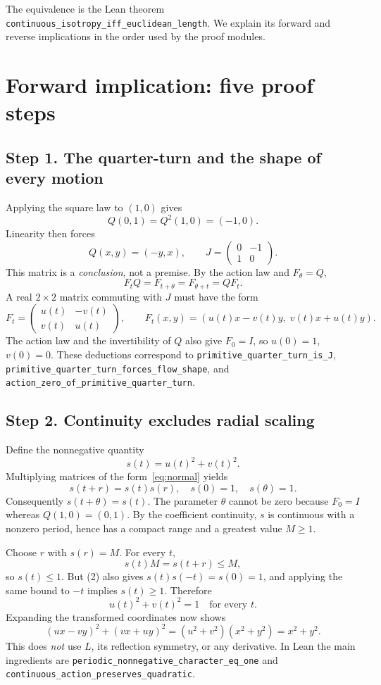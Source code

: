 \documentclass[11pt,a4paper]{article}
\begin{document}
The equivalence is the Lean theorem
\texttt{continuous\_isotropy\_iff\_euclidean\_length}.
We explain its forward and reverse implications in the order
used by the proof modules.

\section{Forward implication: five proof steps}

\subsection*{Step 1. The quarter-turn and the shape of every motion}

Applying the square law to $(1,0)$ gives
\[
 Q(0,1)=Q^2(1,0)=(-1,0).
\]
Linearity then forces
\[
 Q(x,y)=(-y,x),\qquad
 J=\begin{pmatrix}0&-1\\1&0\end{pmatrix}.
\]
This matrix is a \emph{conclusion}, not a premise.
By the action law and $F_\theta=Q$,
\[
 F_tQ=F_{t+\theta}=F_{\theta+t}=QF_t.
\]
A real $2\times2$ matrix commuting with $J$ must have
the form
\[
 F_t=\begin{pmatrix}u(t)&-v(t)\\v(t)&u(t)\end{pmatrix},
 \qquad
 F_t(x,y)=(u(t)x-v(t)y,\;v(t)x+u(t)y).
 \tag{1}\label{eq:normal}
\]
The action law and the invertibility of $Q$ also give $F_0=I$,
so $u(0)=1$, $v(0)=0$.
These deductions correspond to
\texttt{primitive\_quarter\_turn\_is\_J},
\texttt{primitive\_quarter\_turn\_forces\_flow\_shape}, and
\texttt{action\_zero\_of\_primitive\_quarter\_turn}.

\subsection*{Step 2. Continuity excludes radial scaling}

Define the nonnegative quantity
\[
 s(t)=u(t)^2+v(t)^2.
\]
Multiplying matrices of the form~\eqref{eq:normal} yields
\[
 s(t+r)=s(t)s(r),\quad s(0)=1,\quad s(\theta)=1.
 \tag{2}
\]
Consequently $s(t+\theta)=s(t)$. The parameter $\theta$
cannot be zero because $F_0=I$ whereas $Q(1,0)=(0,1)$.
By the coefficient continuity, $s$ is continuous with a
nonzero period, hence has a compact range and a greatest
value $M\ge 1$.

Choose $r$ with $s(r)=M$. For every $t$,
\[
 s(t)M=s(t+r)\le M,
\]
so $s(t)\le1$. But (2) also gives
$s(t)s(-t)=s(0)=1$, and applying the same bound
to $-t$ implies $s(t)\ge1$. Therefore
\[
 \boxed{u(t)^2+v(t)^2=1\quad\text{for every }t.}
 \tag{3}
\]
Expanding the transformed coordinates now shows
\[
 (ux-vy)^2+(vx+uy)^2
 =(u^2+v^2)(x^2+y^2)=x^2+y^2. \tag{4}
\]
This does \emph{not} use $L$, its reflection symmetry, or any
derivative. In Lean the main ingredients are
\texttt{periodic\_nonnegative\_character\_eq\_one} and
\texttt{continuous\_action\_preserves\_quadratic}.
\end{document}
